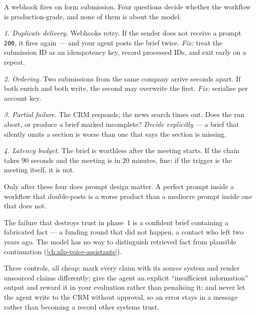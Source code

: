 \begin{workedexample}
A webhook fires on form submission. Four questions decide whether the workflow
is production-grade, and none of them is about the model.

\emph{1. Duplicate delivery.} Webhooks retry. If the sender does not receive a
prompt \texttt{200}, it fires again --- and your agent posts the brief twice.
\emph{Fix:} treat the submission ID as an idempotency key, record processed
IDs, and exit early on a repeat.

\emph{2. Ordering.} Two submissions from the same company arrive seconds
apart. If both enrich and both write, the second may overwrite the first.
\emph{Fix:} serialise per account key.

\emph{3. Partial failure.} The CRM responds; the news search times out. Does
the run abort, or produce a brief marked incomplete? \emph{Decide explicitly}
--- a brief that silently omits a section is worse than one that says the
section is missing.

\emph{4. Latency budget.} The brief is worthless after the meeting starts. If
the chain takes $90$ seconds and the meeting is in $20$ minutes, fine; if the
trigger is the meeting itself, it is not.

Only after these four does prompt design matter. A perfect prompt inside a
workflow that double-posts is a worse product than a mediocre prompt inside one
that does not.
\end{workedexample}

\begin{cautionbox}
The failure that destroys trust in phase~1 is a confident brief containing a
fabricated fact --- a funding round that did not happen, a contact who left two
years ago. The model has no way to distinguish retrieved fact from plausible
continuation (\cref{ch:nlp-voice-assistants}).

Three controls, all cheap: mark every claim with its source system and render
unsourced claims differently; give the agent an explicit ``insufficient
information'' output and reward it in your evaluation rather than penalising
it; and never let the agent write to the CRM without approval, so an error
stays in a message rather than becoming a record other systems trust.
\end{cautionbox}

